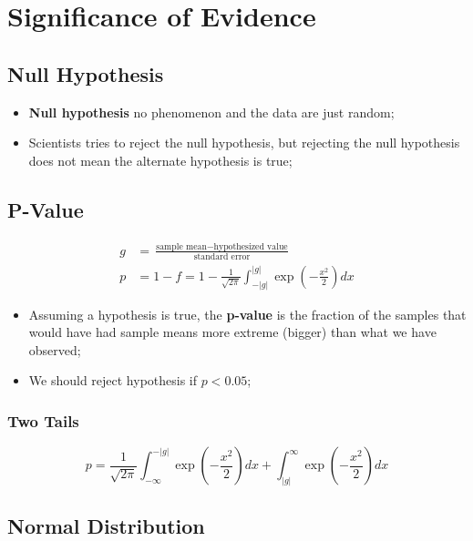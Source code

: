 \chapter{Significance of Evidence}

\section{Null Hypothesis}

  \begin{itemize}
    \item \textbf{Null hypothesis} no phenomenon and the data are just random;
    \item Scientists tries to reject the null hypothesis, but rejecting the null hypothesis does not mean the alternate hypothesis is true;
  \end{itemize}

\section{P-Value}

  \begin{align}
    g &= \frac{\text{sample mean} - \text{hypothesized value}}{\text{standard error}} \\
    p &= 1 - f = 1 - \frac{1}{\sqrt{2\pi}} \int_{-\left| g \right|}^{\left| g \right|} \exp\left( -\frac{x^{2}}{2} \right) dx
  \end{align}

  \begin{itemize}
    \item Assuming a hypothesis is true, the \textbf{p-value} is the fraction of the samples that would have had sample means more extreme (bigger) than what we have observed;
    \item We should reject hypothesis if $ p < 0.05 $;
  \end{itemize}
  
  \subsection{Two Tails}
  
    \begin{equation}
      p = \frac{1}{\sqrt{2\pi}} \int_{-\infty}^{-\left| g \right|} \exp\left( -\frac{x^{2}}{2} \right) dx + \int_{\left| g \right|}^{\infty} \exp\left( -\frac{x^{2}}{2} \right) dx
    \end{equation}

\section{Normal Distribution}

